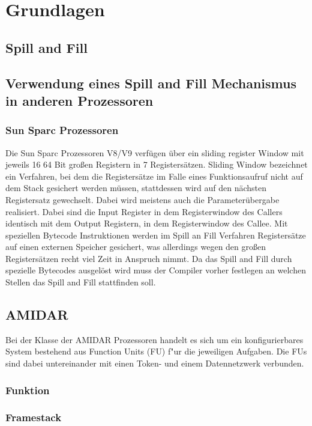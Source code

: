 \chapter{Grundlagen}
\label{cha:Grundlagen}

\section{Spill and Fill}
\section{Verwendung eines Spill and Fill Mechanismus in anderen Prozessoren}
\subsection{Sun Sparc Prozessoren}
Die Sun Sparc Prozessoren V8/V9 verf\"ugen \"uber ein sliding register Window mit jeweils 16 64 Bit großen Registern in 7 Registers\"atzen. Sliding Window bezeichnet ein Verfahren, bei dem die Registers\"atze im Falle eines Funktionsaufruf nicht auf dem Stack gesichert werden m\"ussen, stattdessen wird auf den n\"achsten Registersatz gewechselt. Dabei wird meistens auch die Parameter\"ubergabe realisiert. Dabei sind die Input Register in dem Registerwindow des Callers identisch mit dem Output Registern, in dem Registerwindow des Callee.   
Mit speziellen Bytecode Instruktionen werden im Spill an Fill Verfahren Registers\"atze auf einen externen Speicher gesichert, was allerdings wegen den großen Registers\"atzen recht viel Zeit in Anspruch nimmt. Da das Spill and Fill durch spezielle Bytecodes ausgelöst wird muss der Compiler vorher festlegen an welchen Stellen das Spill and Fill stattfinden soll.
\section{AMIDAR}
Bei der Klasse der AMIDAR Prozessoren handelt es sich um ein konfigurierbares System bestehend aus Function Units (FU) f"ur die jeweiligen Aufgaben. Die FUs sind dabei untereinander mit einen Token- und einem Datennetzwerk verbunden. 
\subsection{Funktion}



\subsection{Framestack}

